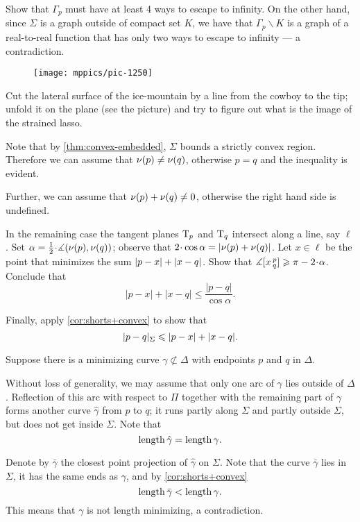 Show that $\Gamma_p$ must have at least 4 ways to escape to infinity.
On the other hand, since $\Sigma$ is a graph outside of compact set $K$, we have that $\Gamma_p\backslash K$ is a graph of a real-to-real function that has only two ways to escape to infinity --- a contradiction.

\setcounter{eqtn}{0}

\begin{wrapfigure}[5]{r}{24 mm}
\vskip-0mm
\centering
\texttt{[image: mppics/pic-1250]}
\vskip-0mm
\end{wrapfigure}

Cut the lateral surface of the ice-mountain by a line from the cowboy to the tip;
unfold it on the plane (see the picture) and try to figure out what is the image of the strained lasso.

Note that by \ref{thm:convex-embedded}, $\Sigma$ bounds a strictly convex region.
Therefore we can assume that $\nu(p)\ne\nu(q)$, otherwise $p=q$ and the inequality is evident.

Further, we can assume that $\nu(p)+\nu(q)\ne 0$, otherwise the right hand side is undefined.


In the remaining case the tangent planes $\mathrm{T}_p$ and $\mathrm{T}_q$ intersect along a line, say $\ell$.
Set $\alpha=\tfrac12\cdot\measuredangle(\Norm(p),\Norm(q))$;
observe that $2\cdot\cos\alpha= |\Norm(p)+\Norm(q)|$.
Let $x\in \ell$ be the point that minimizes the sum $|p-x|\z+|x-q|$.
Show that $\measuredangle\hinge xpq\ge \pi-2\cdot\alpha$.
Conclude that 
\[|p-x|+|x-q|\le \frac{|p-q|}{\cos\alpha}.\]

Finally, apply \ref{cor:shorts+convex} to show that
\[\dist{p}{q}\Sigma\le |p-x|+|x-q|.\]


 Suppose there is a minimizing curve $\gamma\not\subset\Delta$ with endpoints $p$ and $q$ in $\Delta$.

Without loss of generality, we may assume that only one arc of $\gamma$ lies outside of $\Delta$.
Reflection of this arc  with respect to $\Pi$ together with the remaining part of $\gamma$ forms another curve $\hat\gamma$ from $p$ to $q$;
it runs partly along $\Sigma$ 
and partly outside $\Sigma$,
but does not get inside $\Sigma$.
Note that
\[\mathop{\rm length}\nolimits\hat\gamma=\mathop{\rm length}\nolimits\gamma.\]


Denote by $\bar\gamma$ the closest point projection of $\hat\gamma$ on $\Sigma$.
Note that the curve $\bar\gamma$ lies in $\Sigma$, 
it has the same ends as $\gamma$,
and by \ref{cor:shorts+convex}
\[\mathop{\rm length}\nolimits\bar\gamma<\mathop{\rm length}\nolimits\gamma.\]
This means that $\gamma$ is not length minimizing, 
a contradiction.


